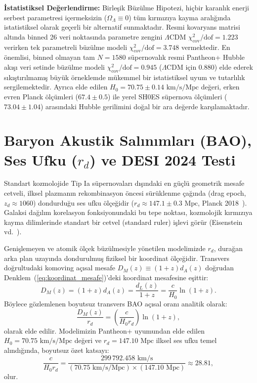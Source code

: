 \documentclass[11pt,a4paper]{article}
\begin{document}
\textbf{İstatistiksel Değerlendirme:}
Birleşik Büzülme Hipotezi, hiçbir karanlık enerji serbest parametresi içermeksizin ($\Omega_\Lambda \equiv 0$) tüm kırmızıya kayma aralığında istatistiksel olarak geçerli bir alternatif sunmaktadır. Resmi kovaryans matrisi altında binned 26 veri noktasında parametre zengini $\Lambda$CDM $\chi^2_{\mathrm{cov}}/\text{dof} = 1.223$ verirken tek parametreli büzülme modeli $\chi^2_{\mathrm{cov}}/\text{dof} = 3.748$ vermektedir. En önemlisi, binned olmayan tam $N = 1580$ süpernovalık resmi Pantheon+ Hubble akışı veri setinde büzülme modeli $\chi^2_{\mathrm{cov}}/\text{dof} = 0.945$ ($\Lambda$CDM için $0.880$) elde ederek sıkıştırılmamış büyük örneklemde mükemmel bir istatistiksel uyum ve tutarlılık sergilemektedir. Ayrıca elde edilen $H_0 = 70.75 \pm 0.14\text{ km/s/Mpc}$ değeri, erken evren Planck ölçümleri ($67.4 \pm 0.5$) ile yerel SH0ES süpernova ölçümleri ($73.04 \pm 1.04$) arasındaki Hubble gerilimini doğal bir ara değerde karşılamaktadır.

\section{Baryon Akustik Salınımları (BAO), Ses Ufku (\texorpdfstring{$r_d$}{r\_d}) ve DESI 2024 Testi}
\label{sec:bao_ve_desi_makale_a}

Standart kozmolojide Tip Ia süpernovaları dışındaki en güçlü geometrik mesafe cetveli, ilksel plazmanın rekombinasyon öncesi sürüklenme çağında (drag epoch, $z_d \approx 1060$) dondurduğu ses ufku ölçeğidir ($r_d \approx 147.1 \pm 0.3\text{ Mpc}$, Planck 2018~\cite{planck2018}). Galaksi dağılım korelasyon fonksiyonundaki bu tepe noktası, kozmolojik kırmızıya kayma dilimlerinde standart bir cetvel (standard ruler) işlevi görür (Eisenstein vd.~\cite{eisenstein2005}).

Genişlemeyen ve atomik ölçek büzülmesiyle yönetilen modelimizde $r_d$, durağan arka plan uzayında dondurulmuş fiziksel bir koordinat ölçeğidir. Transvers doğrultudaki komoving açısal mesafe $D_M(z) \equiv (1+z) d_A(z)$ doğrudan Denklem~(\ref{eq:koordinat_mesafe})'deki koordinat mesafesine eşittir:
\begin{equation}
    D_M(z) = (1+z) d_A(z) = \frac{d_L(z)}{1+z} = \frac{c}{H_0} \ln(1+z).
    \label{eq:dm_bao}
\end{equation}
Böylece gözlemlenen boyutsuz transvers BAO açısal oranı analitik olarak:
\begin{equation}
    \frac{D_M(z)}{r_d} = \left( \frac{c}{H_0 r_d} \right) \ln(1+z),
    \label{eq:dm_over_rd}
\end{equation}
olarak elde edilir. Modelimizin Pantheon+ uyumundan elde edilen $H_0 = 70.75\text{ km/s/Mpc}$ değeri ve $r_d = 147.10\text{ Mpc}$ ilksel ses ufku temel alındığında, boyutsuz özet katsayı:
\begin{equation}
    \frac{c}{H_0 r_d} = \frac{299\,792.458\text{ km/s}}{(70.75\text{ km/s/Mpc}) \times (147.10\text{ Mpc})} \approx 28.81,
\end{equation}
olur. 
\end{document}
